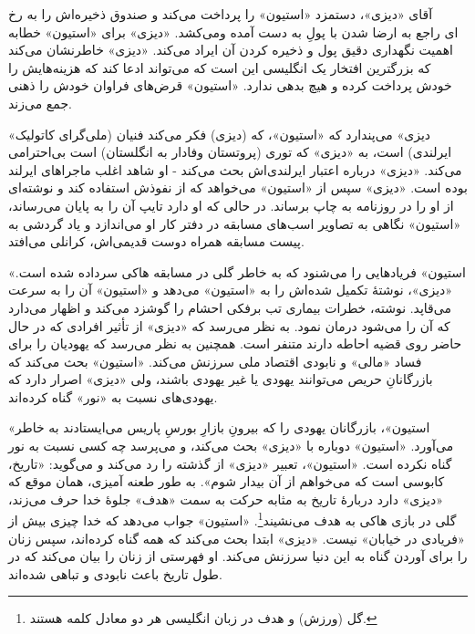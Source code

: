\documentclass[12pt]{book}
\newcommand{\noun}[1]{«{#1}»}
\begin{document}
    آقای \noun{دیزی}، دستمزد \noun{استیون} را پرداخت می‌کند و صندوق ذخیره‌اش را به رخ می‌کشد. \noun{دیزی} برای \noun{استیون} خطابه‎‌ای راجع به ارضا شدن با پولِ به دست آمده و اهمیت نگهداری دقیق پول و ذخیره کردن آن ایراد می‌کند. \noun{دیزی} خاطرنشان می‌کند که بزرگترین افتخار یک انگلیسی این است که می‌تواند ادعا کند که هزینه‌هایش را خودش پرداخت کرده و هیچ بدهی ندارد. \noun{استیون} قرض‌های فراوان خودش را ذهنی جمع می‌زند.

    \noun{دیزی} می‌پندارد که \noun{استیون}، که (دیزی) فکر می‌کند فنیان (ملی‌گرای کاتولیک ایرلندی) است، به \noun{دیزی} که توری (پروتستان وفادار به انگلستان) است بی‌احترامی می‌کند. \noun{دیزی} درباره اعتبار ایرلندی‌اش بحث می‌کند - او شاهد اغلب ماجراهای ایرلند بوده است. \noun{دیزی} سپس از \noun{استیون} می‌خواهد که از نفوذش استفاده کند و نوشته‌ای از او را در روزنامه به چاپ برساند. در حالی که او دارد تایپ آن را به پایان می‌رساند، \noun{استیون} نگاهی به تصاویر اسب‌های مسابقه در دفتر کار او می‌اندازد و یاد گردشی به پیست مسابقه همراه دوست قدیمی‌اش، کرانلی می‌افتد.

    \noun{استیون} فریادهایی را می‌شنود که به خاطر گلی در مسابقه هاکی سرداده شده است. \noun{دیزی}، نوشتۀ تکمیل شده‌اش را به \noun{استیون} می‌دهد و \noun{استیون} آن را به سرعت می‌قاپد. نوشته، خطرات بیماری تب برفکی احشام را گوشزد می‌کند و اظهار می‌دارد که آن را می‌شود درمان نمود. به نظر می‌رسد که \noun{دیزی} از تأثیر افرادی که در حال حاضر روی قضیه احاطه دارند متنفر است. همچنین به نظر می‌رسد که یهودیان را برای فساد \noun{مالی} و نابودی اقتصاد ملی سرزنش می‌کند. \noun{استیون} بحث می‌کند که بازرگانانِ حریص می‌توانند یهودی یا غیر یهودی باشند، ولی \noun{دیزی} اصرار دارد که یهودی‌های نسبت به «نور» گناه کرده‌اند.

    \noun{استیون}، بازرگانان یهودی را که بیرونِ بازارِ بورسِ پاریس می‌ایستادند به خاطر می‌آورد. \noun{استیون} دوباره با \noun{دیزی} بحث می‌کند، و می‌پرسد چه کسی نسبت به نور گناه نکرده است. \noun{استیون}، تعبیر \noun{دیزی} از گذشته را رد می‌کند و می‌گوید: «تاریخ، کابوسی است که می‌خواهم از آن بیدار شوم». به طور طعنه آمیزی، همان موقع که \noun{دیزی} دارد دربارۀ تاریخ به مثابه حرکت به سمت «هدف» جلوۀ خدا حرف می‌زند، گلی در بازی هاکی به هدف می‌نشیند\footnote{ گل (ورزش) و هدف در زبان انگلیسی هر دو معادل کلمه  هستند.}. \noun{استیون} جواب می‌دهد که خدا چیزی بیش از «فریادی در خیابان» نیست. \noun{دیزی} ابتدا بحث می‌کند که همه گناه کرده‌اند، سپس زنان را برای آوردن گناه به این دنیا سرزنش می‌کند. او فهرستی از زنان را بیان می‌کند که در طول تاریخ باعث نابودی و تباهی شده‌اند.
\end{document}
